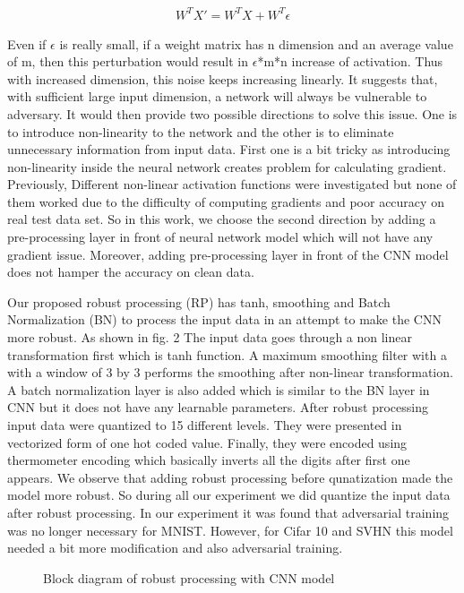 \documentclass[conference]{IEEEtran}
\begin{document}
\begin{gather*}{W^TX'=W^TX+W^T\epsilon}
\end{gather*}

Even if $\epsilon$ is really small, if a weight matrix has n dimension and an average value of m, then this perturbation would result in $\epsilon$*m*n increase of activation. Thus with increased dimension, this noise keeps increasing linearly. It suggests that, with sufficient large input dimension, a network will always be vulnerable to adversary. It would then provide two possible directions to solve this issue. One is to introduce non-linearity to the network and the other is to eliminate unnecessary information from input data. First one is a bit tricky as introducing non-linearity inside the neural network creates problem for calculating gradient. Previously, Different non-linear activation functions were investigated but none of them worked due to the difficulty of computing gradients and poor accuracy on real test data set. So in this work, we choose the second direction by adding a pre-processing layer in front of neural network model which will not have any gradient issue. Moreover, adding pre-processing layer in front of the CNN model does not hamper the accuracy on clean data. 

Our proposed robust processing (RP) has tanh, smoothing and Batch Normalization (BN) to process the input data in an attempt to make the CNN more robust. As shown in fig. 2 The input data goes through a non linear transformation first which is tanh function. A maximum smoothing filter with a with a window of 3 by 3 performs the smoothing after non-linear transformation. A batch normalization layer is also added which is similar to the BN layer in CNN but it does not have any learnable parameters. After robust processing input data were quantized to 15 different levels. They were presented in vectorized form of one hot coded value. Finally, they were encoded using thermometer encoding which basically inverts all the digits after first one appears. We observe that adding robust processing before qunatization made the model more robust. So during all our experiment we did quantize the input data after robust processing. In our experiment it was found that adversarial training was no longer necessary for MNIST. However, for Cifar 10 and SVHN this model needed a bit more modification and also adversarial training.

\begin{figure}[h]
\centering
{}
\caption{Block diagram of robust processing with CNN model}
\end{figure}
\end{document}
